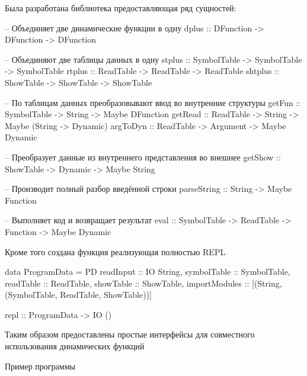 Была разработана библиотека предоставляющая ряд сущностей:
\begin{code}
-- Объединяет две динамические функции в одну
dplus :: DFunction -> DFunction -> DFunction

-- Объединяют две таблицы данных в одну
stplus :: SymbolTable -> SymbolTable -> SymbolTable
rtplus :: ReadTable -> ReadTable -> ReadTable
shtplus :: ShowTable -> ShowTable -> ShowTable

-- По таблицам данных преобразовывают ввод во внутренние структуры
getFun :: SymbolTable -> String -> Maybe DFunction
getRead :: ReadTable -> String -> Maybe (String -> Dynamic)
argToDyn :: ReadTable -> Argument -> Maybe Dynamic

-- Преобразует данные из внутреннего представления во внешнее
getShow :: ShowTable -> Dynamic -> Maybe String

-- Производит полный разбор введённой строки
parseString :: String -> Maybe Function

-- Выполняет код и возвращает результат
eval :: SymbolTable -> ReadTable -> Function -> Maybe Dynamic
\end{code}

Кроме того создана функция реализующая полностью REPL
\begin{code}
data ProgramData =
  PD { readInput :: IO String,
       symbolTable :: SymbolTable,
       readTable :: ReadTable,
       showTable :: ShowTable,
       importModules :: [(String, (SymbolTable, ReadTable, ShowTable))]
     }

repl :: ProgramData -> IO ()
\end{code}

Таким образом предоставлены простые интерфейсы для совместного
использования динамических функций

Пример программы

